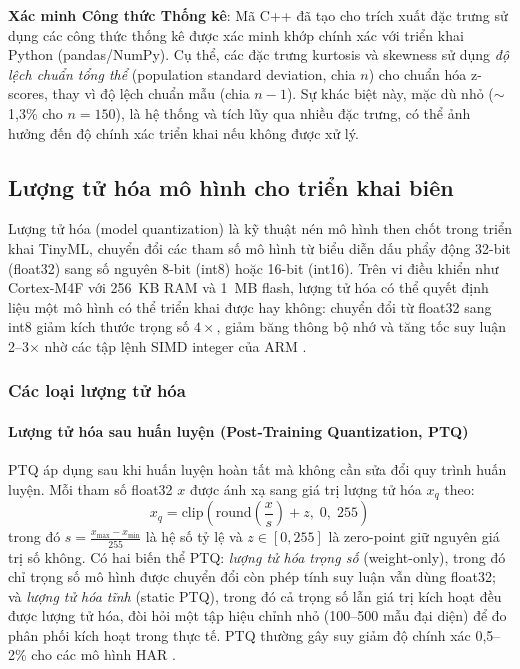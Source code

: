 \textbf{Xác minh Công thức Thống kê}: Mã C++ đã tạo cho trích xuất đặc trưng sử dụng các công thức thống kê được xác minh khớp chính xác với triển khai Python (pandas/NumPy). Cụ thể, các đặc trưng kurtosis và skewness sử dụng \textit{độ lệch chuẩn tổng thể} (population standard deviation, chia $n$) cho chuẩn hóa z-scores, thay vì độ lệch chuẩn mẫu (chia $n-1$). Sự khác biệt này, mặc dù nhỏ ($\sim$1,3\% cho $n=150$), là hệ thống và tích lũy qua nhiều đặc trưng, có thể ảnh hưởng đến độ chính xác triển khai nếu không được xử lý.

\subsection{Lượng tử hóa mô hình cho triển khai biên}
\label{sec:quantization}

Lượng tử hóa (model quantization) là kỹ thuật nén mô hình then chốt trong triển khai TinyML, chuyển đổi các tham số mô hình từ biểu diễn dấu phẩy động 32-bit (float32) sang số nguyên 8-bit (int8) hoặc 16-bit (int16). Trên vi điều khiển như Cortex-M4F với 256~KB RAM và 1~MB flash, lượng tử hóa có thể quyết định liệu một mô hình có thể triển khai được hay không: chuyển đổi từ float32 sang int8 giảm kích thước trọng số $4\times$, giảm băng thông bộ nhớ và tăng tốc suy luận 2--3$\times$ nhờ các tập lệnh SIMD integer của ARM \cite{lin2022mcunet}.

\subsubsection{Các loại lượng tử hóa}

\paragraph{Lượng tử hóa sau huấn luyện (Post-Training Quantization, PTQ)}
PTQ áp dụng sau khi huấn luyện hoàn tất mà không cần sửa đổi quy trình huấn luyện. Mỗi tham số float32 $x$ được ánh xạ sang giá trị lượng tử hóa $x_q$ theo:
\begin{equation}
    x_q = \mathrm{clip}\!\left(\mathrm{round}\!\left(\frac{x}{s}\right) + z,\; 0,\; 255\right)
    \label{eq:quantization}
\end{equation}
trong đó $s = \frac{x_{\max} - x_{\min}}{255}$ là hệ số tỷ lệ và $z \in [0, 255]$ là zero-point giữ nguyên giá trị số không. Có hai biến thể PTQ: \textit{lượng tử hóa trọng số} (weight-only), trong đó chỉ trọng số mô hình được chuyển đổi còn phép tính suy luận vẫn dùng float32; và \textit{lượng tử hóa tĩnh} (static PTQ), trong đó cả trọng số lẫn giá trị kích hoạt đều được lượng tử hóa, đòi hỏi một tập hiệu chỉnh nhỏ (100--500 mẫu đại diện) để đo phân phối kích hoạt trong thực tế. PTQ thường gây suy giảm độ chính xác 0,5--2\% cho các mô hình HAR \cite{warden2019tinyml}.

